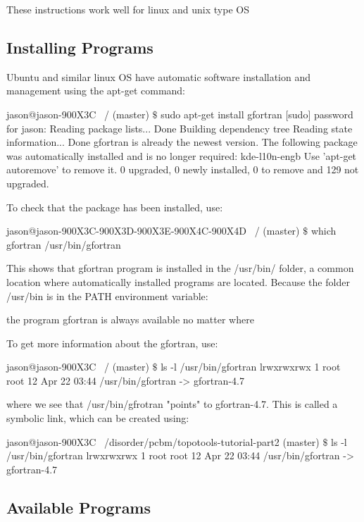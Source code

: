 These instructions work well for linux and unix type OS

\subsection{Installing Programs}

Ubuntu and similar linux OS have automatic software installation and 
management using the apt-get command:

jason@jason-900X3C ~/ (master) $\$$ sudo apt-get install gfortran
[sudo] password for jason: 
Reading package lists... Done
Building dependency tree       
Reading state information... Done
gfortran is already the newest version.
The following package was automatically installed and is no longer required:
  kde-l10n-engb
Use 'apt-get autoremove' to remove it.
0 upgraded, 0 newly installed, 0 to remove and 129 not upgraded.


To check that the package has been installed, use:

jason@jason-900X3C-900X3D-900X3E-900X4C-900X4D ~/ (master) $\$$ which gfortran
/usr/bin/gfortran

This shows that gfortran program is installed in the /usr/bin/ folder, a common location where automatically installed programs are located. Because the 
folder /usr/bin is in the PATH environment variable:


the program gfortran is always available no matter where 

To get more information about the gfortran, use:

jason@jason-900X3C ~/ (master) $\$$ ls -l /usr/bin/gfortran
lrwxrwxrwx 1 root root 12 Apr 22 03:44 /usr/bin/gfortran -> gfortran-4.7

where we see that /usr/bin/gfrotran "points" to gfortran-4.7. This is called a symbolic link, which can be created using:

jason@jason-900X3C ~/disorder/pcbm/topotools-tutorial-part2 (master) $\$$ ls -l /usr/bin/gfortran
lrwxrwxrwx 1 root root 12 Apr 22 03:44 /usr/bin/gfortran -> gfortran-4.7

\subsection{Available Programs}

